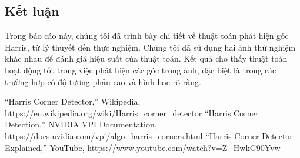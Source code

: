 \documentclass[12pt]{article}
\begin{document}
\subsection{Kết luận}

Trong báo cáo này, chúng tôi đã trình bày chi tiết về thuật toán phát hiện góc Harris, từ lý thuyết đến thực nghiệm. Chúng tôi đã sử dụng hai ảnh thử nghiệm khác nhau để đánh giá hiệu suất của thuật toán. Kết quả cho thấy thuật toán hoạt động tốt trong việc phát hiện các góc trong ảnh, đặc biệt là trong các trường hợp có độ tương phản cao và hình học rõ ràng.\\

% 

% 
\begin{thebibliography}{9}
``Harris Corner Detector,'' Wikipedia,
\url{https://en.wikipedia.org/wiki/Harris_corner_detector}
``Harris Corner Detection,'' NVIDIA VPI Documentation,
\url{https://docs.nvidia.com/vpi/algo_harris_corners.html}
``Harris Corner Detector Explained,'' YouTube,
\url{https://www.youtube.com/watch?v=Z_HwkG90Yvw}
\end{thebibliography}


\end{document}
